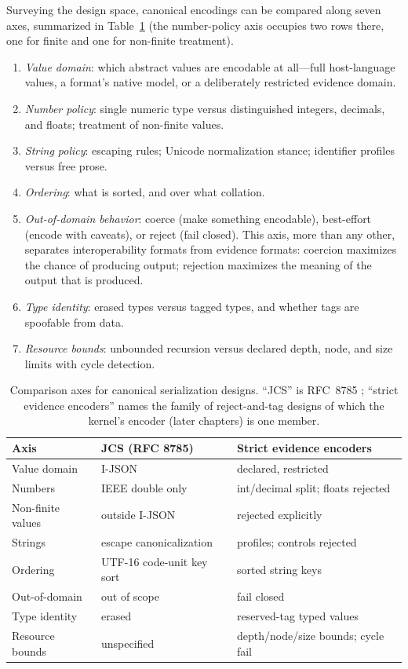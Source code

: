 Surveying the design space, canonical encodings can be compared along
seven axes, summarized in Table~\ref{ch02:tab-axes} (the number-policy
axis occupies two rows there, one for finite and one for non-finite
treatment).

\begin{enumerate}
\item \emph{Value domain}: which abstract values are encodable at
all---full host-language values, a format's native model, or a
deliberately restricted evidence domain.
\item \emph{Number policy}: single numeric type versus distinguished
integers, decimals, and floats; treatment of non-finite values.
\item \emph{String policy}: escaping rules; Unicode normalization
stance; identifier profiles versus free prose.
\item \emph{Ordering}: what is sorted, and over what collation.
\item \emph{Out-of-domain behavior}: coerce (make something
encodable), best-effort (encode with caveats), or reject (fail
closed). This axis, more than any other, separates interoperability
formats from evidence formats: coercion maximizes the chance of
producing output; rejection maximizes the meaning of the output that
is produced.
\item \emph{Type identity}: erased types versus tagged types, and
whether tags are spoofable from data.
\item \emph{Resource bounds}: unbounded recursion versus declared
depth, node, and size limits with cycle detection.
\end{enumerate}

\begin{table}[htbp]
\centering
\caption{Comparison axes for canonical serialization designs. ``JCS''
is RFC~8785 \cite{jcs}; ``strict evidence encoders'' names the family
of reject-and-tag designs of which the kernel's encoder (later
chapters) is one member.}
\label{ch02:tab-axes}
\begin{tabular}{@{}lll@{}}
\toprule
Axis & JCS (RFC 8785) & Strict evidence encoders \\
\midrule
Value domain & I-JSON & declared, restricted \\
Numbers & IEEE double only & int/decimal split; floats rejected \\
Non-finite values & outside I-JSON & rejected explicitly \\
Strings & escape canonicalization & profiles; controls rejected \\
Ordering & UTF-16 code-unit key sort & sorted string keys \\
Out-of-domain & out of scope & fail closed \\
Type identity & erased & reserved-tag typed values \\
Resource bounds & unspecified & depth/node/size bounds; cycle fail \\
\bottomrule
\end{tabular}
\end{table}

